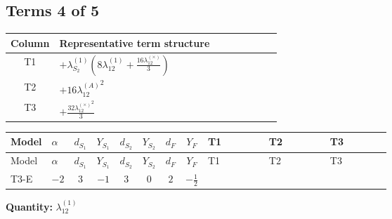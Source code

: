 \documentclass[8pt]{article}
\begin{document}
\begin{landscape}
\subsection*{Terms 4 of 5}
\begin{center}
\begin{tabular}{@{}c >{\raggedright\arraybackslash}p{0.82\linewidth}@{}}
\toprule
Column & Representative term structure \\
\midrule
T1 & \(\displaystyle +{\lambda_{S_2}^{(1)}} \left(8 {\lambda_{12}^{(1)}}+\frac{16 {\lambda_{12}^{(\times)}}}{3}\right)\) \\
\midrule
T2 & \(\displaystyle +16 {\lambda_{12}^{(A)}}^2\) \\
\midrule
T3 & \(\displaystyle +\frac{32 {\lambda_{12}^{(\times)}}^2}{3}\) \\
\midrule
\bottomrule
\end{tabular}
\end{center}
\smallskip
\tiny
\begin{longtable}{@{}llcccccc >{\raggedright\arraybackslash}p{0.21\linewidth} >{\raggedright\arraybackslash}p{0.21\linewidth} >{\raggedright\arraybackslash}p{0.21\linewidth}@{}}
\toprule
Model & $\alpha$ & $d_{S_1}$ & $Y_{S_1}$ & $d_{S_2}$ & $Y_{S_2}$ & $d_F$ & $Y_F$ & T1 & T2 & T3 \\
\midrule
\endfirsthead
\toprule
Model & $\alpha$ & $d_{S_1}$ & $Y_{S_1}$ & $d_{S_2}$ & $Y_{S_2}$ & $d_F$ & $Y_F$ & T1 & T2 & T3 \\
\midrule
\endhead
T3-E & $-2$ & $3$ & $-1$ & $3$ & $0$ & $2$ & $-\frac{1}{2}$ & \scriptsize\adjustbox{max width=\linewidth}{$\begin{gathered} +{\lambda_{S_2}^{(1)}} \left(8 {\lambda_{12}^{(1)}}+\frac{16 {\lambda_{12}^{(\times)}}}{3}\right)\end{gathered}$} & \scriptsize\adjustbox{max width=\linewidth}{$\begin{gathered} +16 {\lambda_{12}^{(A)}}^2\end{gathered}$} & \scriptsize\adjustbox{max width=\linewidth}{$\begin{gathered} +\frac{32 {\lambda_{12}^{(\times)}}^2}{3}\end{gathered}$} \\
\midrule
\bottomrule
\end{longtable}
\clearpage
\noindent\textbf{Quantity: }$\lambda_{12}^{(1)}$\par\smallskip

\end{landscape}
\end{document}
